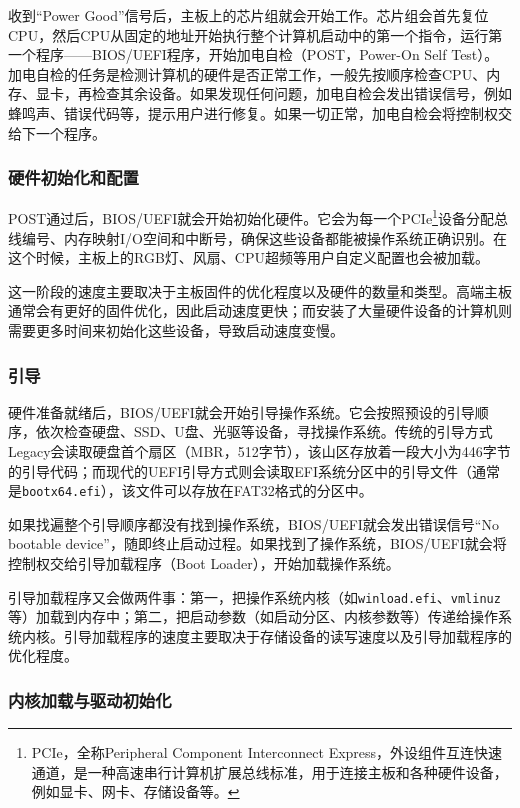 收到“Power Good”信号后，主板上的芯片组就会开始工作。芯片组会首先复位CPU，然后CPU从固定的地址开始执行整个计算机启动中的第一个指令，运行第一个程序——BIOS/UEFI程序，开始加电自检（POST，Power-On Self Test）。加电自检的任务是检测计算机的硬件是否正常工作，一般先按顺序检查CPU、内存、显卡，再检查其余设备。如果发现任何问题，加电自检会发出错误信号，例如蜂鸣声、错误代码等，提示用户进行修复。如果一切正常，加电自检会将控制权交给下一个程序。

\subsubsection{硬件初始化和配置}

POST通过后，BIOS/UEFI就会开始初始化硬件。它会为每一个PCIe\footnote{PCIe，全称Peripheral Component Interconnect Express，外设组件互连快速通道，是一种高速串行计算机扩展总线标准，用于连接主板和各种硬件设备，例如显卡、网卡、存储设备等。}设备分配总线编号、内存映射I/O空间和中断号，确保这些设备都能被操作系统正确识别。在这个时候，主板上的RGB灯、风扇、CPU超频等用户自定义配置也会被加载。

这一阶段的速度主要取决于主板固件的优化程度以及硬件的数量和类型。高端主板通常会有更好的固件优化，因此启动速度更快；而安装了大量硬件设备的计算机则需要更多时间来初始化这些设备，导致启动速度变慢。

\subsubsection{引导}

硬件准备就绪后，BIOS/UEFI就会开始引导操作系统。它会按照预设的引导顺序，依次检查硬盘、SSD、U盘、光驱等设备，寻找操作系统。传统的引导方式Legacy会读取硬盘首个扇区（MBR，512字节），该山区存放着一段大小为446字节的引导代码；而现代的UEFI引导方式则会读取EFI系统分区中的引导文件（通常是\texttt{bootx64.efi}），该文件可以存放在FAT32格式的分区中。

如果找遍整个引导顺序都没有找到操作系统，BIOS/UEFI就会发出错误信号“No bootable device”，随即终止启动过程。如果找到了操作系统，BIOS/UEFI就会将控制权交给引导加载程序（Boot Loader），开始加载操作系统。

引导加载程序又会做两件事：第一，把操作系统内核（如\texttt{winload.efi}、\texttt{vmlinuz}等）加载到内存中；第二，把启动参数（如启动分区、内核参数等）传递给操作系统内核。引导加载程序的速度主要取决于存储设备的读写速度以及引导加载程序的优化程度。

\subsubsection{内核加载与驱动初始化}

